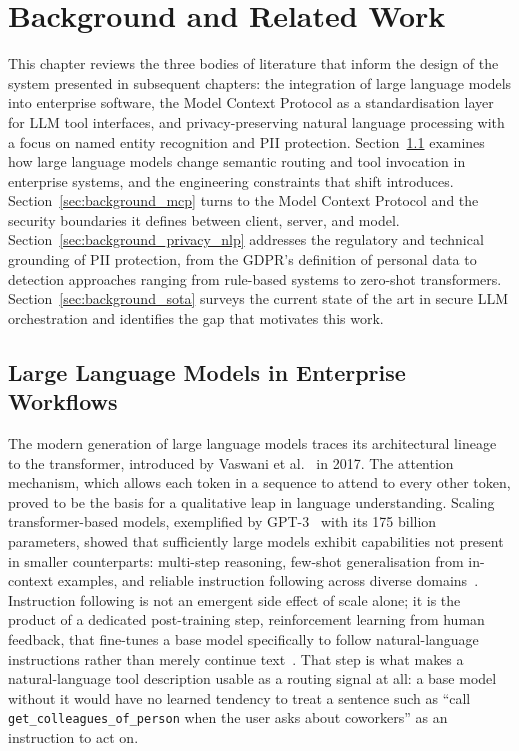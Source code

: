 \chapter{Background and Related Work}
\label{ch:background}

This chapter reviews the three bodies of literature that inform the design of the system presented in subsequent chapters: the integration of large language models into enterprise software, the Model Context Protocol as a standardisation layer for LLM tool interfaces, and privacy-preserving natural language processing with a focus on named entity recognition and PII protection. Section~\ref{sec:background_llm_enterprise} examines how large language models change semantic routing and tool invocation in enterprise systems, and the engineering constraints that shift introduces. Section~\ref{sec:background_mcp} turns to the Model Context Protocol and the security boundaries it defines between client, server, and model. Section~\ref{sec:background_privacy_nlp} addresses the regulatory and technical grounding of PII protection, from the GDPR's definition of personal data to detection approaches ranging from rule-based systems to zero-shot transformers. Section~\ref{sec:background_sota} surveys the current state of the art in secure LLM orchestration and identifies the gap that motivates this work.

\section{Large Language Models in Enterprise Workflows}
\label{sec:background_llm_enterprise}

The modern generation of large language models traces its architectural lineage to the transformer, introduced by Vaswani et al.~\cite{vaswani2017attention} in 2017. The attention mechanism, which allows each token in a sequence to attend to every other token, proved to be the basis for a qualitative leap in language understanding. Scaling transformer-based models, exemplified by GPT-3~\cite{brown2020language} with its 175 billion parameters, showed that sufficiently large models exhibit capabilities not present in smaller counterparts: multi-step reasoning, few-shot generalisation from in-context examples, and reliable instruction following across diverse domains~\cite{wei2022emergent}. Instruction following is not an emergent side effect of scale alone; it is the product of a dedicated post-training step, reinforcement learning from human feedback, that fine-tunes a base model specifically to follow natural-language instructions rather than merely continue text~\cite{ouyang2022instructgpt}. That step is what makes a natural-language tool description usable as a routing signal at all: a base model without it would have no learned tendency to treat a sentence such as ``call \texttt{get\_colleagues\_of\_person} when the user asks about coworkers'' as an instruction to act on.

